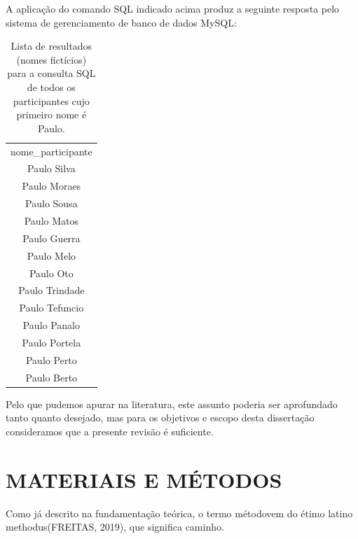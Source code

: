 \documentclass[
12pt,		%
openright,	%
twoside,  %
a4paper,			%
chapter=TITLE,		%
english,			%
french,				%
spanish,			%
brazil				%
]{USPSC-classe/USPSC}
\begin{document}
A aplica\c{c}\~ao do comando SQL indicado acima produz a seguinte resposta pelo sistema de gerenciamento de banco de dados MySQL:














\begin{table}[htb]
\tiny
\caption{\label{fe3cd6334e1b9072eda70730e1734e26869d9c57}Lista de resultados (nomes fict\'{i}cios) para a consulta SQL de todos os participantes cujo primeiro nome \'e Paulo.}

\centering
\begin{tabular}{|c|}
\hline
nome\_participante        \\
Paulo Silva              \\
Paulo Moraes \\
Paulo Sousa \\
Paulo Matos \\
Paulo Guerra \\
Paulo Melo \\
Paulo Oto \\
Paulo Trindade \\
Paulo Tefuncio \\
Paulo Panalo \\
Paulo Portela \\
Paulo Perto \\
Paulo Berto \\
\hline
\end{tabular}
\end{table}


Pelo que pudemos apurar na literatura, este assunto poderia ser aprofundado tanto quanto desejado, mas para os objetivos e escopo desta disserta\c{c}\~ao consideramos que a presente revis\~ao \'e suficiente.










\chapter[MATERIAIS E M\'ETODOS]{MATERIAIS E M\'ETODOS}\label{MATERIAIS E M\'ETODOS}
Como j\'a descrito na fundamenta\c{c}\~ao te\'orica, o termo \textquotedbl m\'etodo\textquotedbl  vem do \'etimo latino \textquotedbl methodus\textquotedbl   (FREITAS, 2019), que significa \textquotedbl caminho\textquotedbl .
\end{document}
